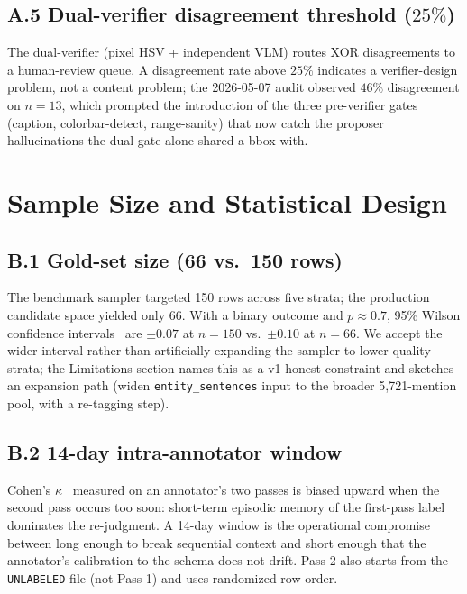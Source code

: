 \documentclass[10pt,twocolumn,letterpaper]{article}
\begin{document}
\subsection*{A.5 Dual-verifier disagreement threshold ($25\%$)}
\noindent The dual-verifier (pixel HSV + independent VLM) routes XOR
disagreements to a human-review queue. A disagreement rate above $25\%$
indicates a verifier-design problem, not a content problem; the 2026-05-07
audit observed $46\%$ disagreement on $n{=}13$, which prompted the
introduction of the three pre-verifier gates (caption, colorbar-detect,
range-sanity) that now catch the proposer hallucinations the dual gate
alone shared a bbox with.

\section{Sample Size and Statistical Design}
\label{app:sample}

\subsection*{B.1 Gold-set size (66 vs.\ 150 rows)}
\noindent The benchmark sampler targeted 150 rows across five strata; the
production candidate space yielded only 66. With a binary outcome and
$p \approx 0.7$, 95\% Wilson confidence
intervals~\cite{wilson1927} are
$\pm 0.07$ at $n{=}150$ vs.\ $\pm 0.10$ at $n{=}66$. We accept the wider
interval rather than artificially expanding the sampler to lower-quality
strata; the Limitations section names this as a v1 honest constraint and
sketches an expansion path (widen \texttt{entity\_sentences} input to the
broader 5{,}721-mention pool, with a re-tagging step).

\subsection*{B.2 14-day intra-annotator window}
\noindent Cohen's $\kappa$~\cite{landis1977kappa} measured on an
annotator's two passes is biased upward when the second pass occurs too
soon: short-term episodic memory of the first-pass label dominates the
re-judgment. A 14-day window is the operational compromise between long
enough to break sequential context and short enough that the annotator's
calibration to the schema does not drift. Pass-2 also starts from the
\texttt{UNLABELED} file (not Pass-1) and uses randomized row order.
\end{document}
